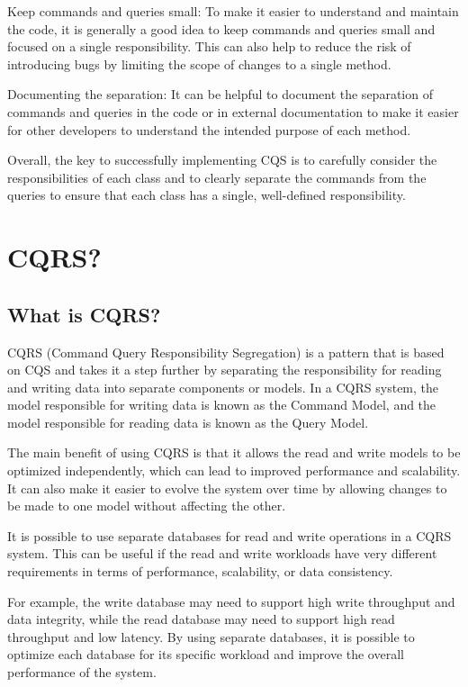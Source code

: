 \documentclass[11pt,conference]{IEEEtran}
\begin{document}
Keep commands and queries small: To make it easier to understand and maintain the code, it is generally a good idea to keep commands and queries small and focused on a single responsibility. This can also help to reduce the risk of introducing bugs by limiting the scope of changes to a single method.

Documenting the separation: It can be helpful to document the separation of commands and queries in the code or in external documentation to make it easier for other developers to understand the intended purpose of each method.

Overall, the key to successfully implementing CQS is to carefully consider the responsibilities of each class and to clearly separate the commands from the queries to ensure that each class has a single, well-defined responsibility.

\section{CQRS?}

\subsection{What is CQRS?}
CQRS (Command Query Responsibility Segregation) is a pattern that is based on CQS and takes it a step further by separating the responsibility for reading and writing data into separate components or models. In a CQRS system, the model responsible for writing data is known as the Command Model, and the model responsible for reading data is known as the Query Model.

The main benefit of using CQRS is that it allows the read and write models to be optimized independently, which can lead to improved performance and scalability. It can also make it easier to evolve the system over time by allowing changes to be made to one model without affecting the other.

It is possible to use separate databases for read and write operations in a CQRS system. This can be useful if the read and write workloads have very different requirements in terms of performance, scalability, or data consistency.

For example, the write database may need to support high write throughput and data integrity, while the read database may need to support high read throughput and low latency. By using separate databases, it is possible to optimize each database for its specific workload and improve the overall performance of the system.
\end{document}
